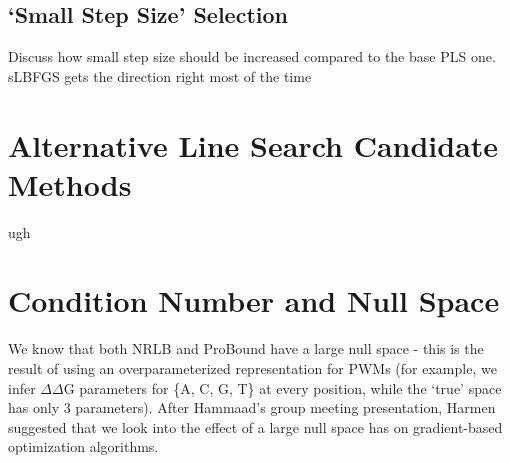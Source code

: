 \documentclass{article}
\begin{document}
\subsection{`Small Step Size' Selection}
Discuss how small step size should be increased compared to the base PLS one. sLBFGS gets the direction right most of the time
\section{Alternative Line Search Candidate Methods}
ugh
\section{Condition Number and Null Space}
We know that both NRLB and ProBound have a large null space - this is the result of using an overparameterized representation for PWMs (for example, we infer $\Delta\Delta$G parameters for \{A, C, G, T\} at every position, while the `true' space has only 3 parameters). After Hammaad's group meeting presentation, Harmen suggested that we look into the effect of a large null space has on gradient-based optimization algorithms. 
\end{document}
